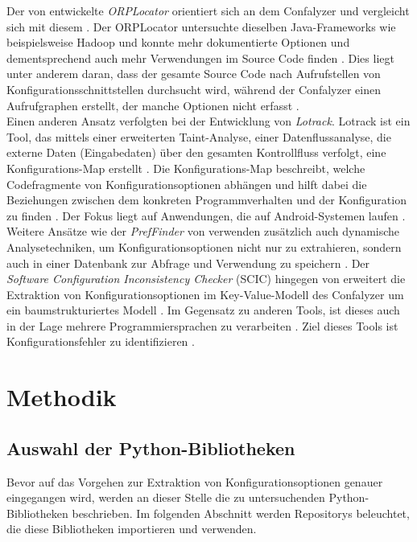 \documentclass[german,bachelor]{swsLeipzig}
\begin{document}
Der von \citeauthor{7774519} entwickelte \textit{ORPLocator} orientiert sich an dem Confalyzer und vergleicht sich mit diesem \cite[]{7774519}.
Der ORPLocator untersuchte dieselben Java-Frameworks wie beispielsweise Hadoop und konnte mehr dokumentierte
Optionen und dementsprechend auch mehr Verwendungen im Source Code finden \cite[]{7774519}.
Dies liegt unter anderem daran, dass der gesamte Source Code nach Aufrufstellen von Konfigurationsschnittstellen durchsucht wird,
während der Confalyzer einen Aufrufgraphen erstellt, der manche Optionen nicht erfasst \cite[]{7774519}.\\

Einen anderen Ansatz verfolgten \citeauthor{8049300} bei der Entwicklung von \textit{Lotrack}.
Lotrack ist ein Tool, das mittels einer erweiterten Taint-Analyse, einer Datenflussanalyse, die externe Daten
(Eingabedaten) über den gesamten Kontrollfluss verfolgt, eine Konfigurations-Map erstellt \cite[]{8049300}.
Die Konfigurations-Map beschreibt, welche Codefragmente von Konfigurationsoptionen abhängen und hilft dabei die
Beziehungen zwischen dem konkreten Programmverhalten und der Konfiguration zu finden \cite[]{8049300}.
Der Fokus liegt auf Anwendungen, die auf Android-Systemen laufen \cite[]{8049300}. \\

Weitere Ansätze wie der \textit{PrefFinder} von \citeauthor{10.1145/2642937.2643009} verwenden zusätzlich auch dynamische
Analysetechniken, um Konfigurationsoptionen nicht nur zu extrahieren, sondern auch in einer Datenbank zur Abfrage und
Verwendung zu speichern \cite[]{10.1145/2642937.2643009}.
Der \textit{Software Configuration Inconsistency Checker} (SCIC) hingegen von \citeauthor{10.1145/2786805.2786869}
erweitert die Extraktion von Konfigurationsoptionen im Key-Value-Modell des Confalyzer um ein baumstrukturiertes Modell \cite[]{10.1145/2786805.2786869}.
Im Gegensatz zu anderen Tools, ist dieses auch in der Lage mehrere Programmiersprachen zu verarbeiten \cite[]{10.1145/2786805.2786869}.
Ziel dieses Tools ist Konfigurationsfehler zu identifizieren \cite[]{10.1145/2786805.2786869}.\\


\chapter{Methodik}\label{Methodik}


\section{Auswahl der Python-Bibliotheken}
Bevor auf das Vorgehen zur Extraktion von Konfigurationsoptionen genauer eingegangen wird, werden an dieser Stelle die
zu untersuchenden Python-Bibliotheken beschrieben.
Im folgenden Abschnitt werden Repositorys beleuchtet, die diese Bibliotheken importieren und verwenden.\\
\end{document}
